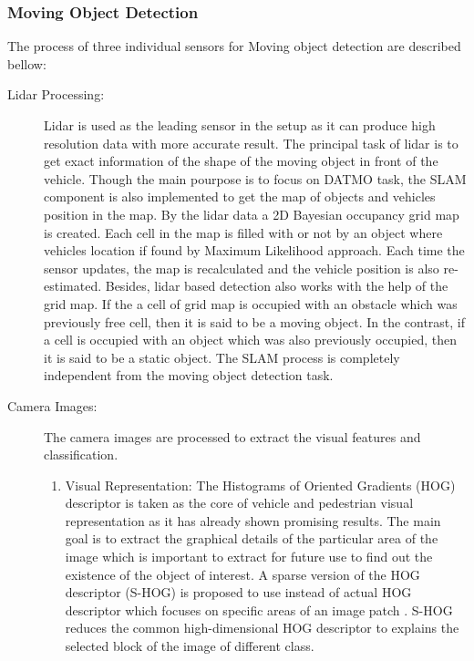 \subsubsection{Moving Object Detection}
The process of three individual sensors for Moving object detection are described bellow:
\begin{description}
    \item[Lidar Processing:] Lidar is used as the leading sensor in the setup as it can produce high resolution data with more accurate result. The principal task of lidar is to get exact information of the shape of the moving object in front of the vehicle. Though the main pourpose is to focus on DATMO task, the SLAM component is also implemented to get the map of objects and vehicles position in the map\cite{Chavez_Garcia_2016}. By the lidar data a 2D Bayesian occupancy grid map is created. Each cell in the map is filled with or not by an object where vehicles location if found by Maximum Likelihood approach. Each time the sensor updates, the map is recalculated and the vehicle position is also re-estimated. Besides, lidar based detection also works with the help of the grid map. If the a cell of grid map is occupied with an obstacle which was previously free cell, then it is said to be a moving object. In the contrast, if a cell is occupied with an object which was also previously occupied, then it is said to be a static object. The SLAM process is completely independent from the moving object detection task.
    \item[Camera Images:] The camera images are processed to extract the visual features and classification.
    \begin{enumerate}
        \item{Visual Representation:} The Histograms of Oriented Gradients (HOG) descriptor is taken as the core of vehicle and pedestrian visual representation as it has already shown promising results\cite{Chavez_Garcia_2016}. The main goal is to extract the graphical details of the particular area of the image which is important to extract for future use to find out the existence of the object of interest. A sparse version of the HOG descriptor (S-HOG) is proposed to use instead of actual HOG descriptor which focuses on specific areas of an image patch \cite{Chavez_Garcia_2016}. S-HOG reduces the common high-dimensional HOG descriptor to explains the selected block of the image of different class.

\end{enumerate}
\end{description}
